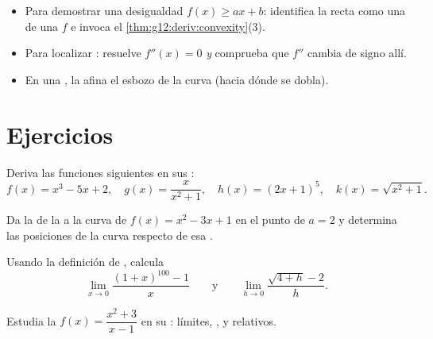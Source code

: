 \begin{method}\label{met:g12:deriv:convexity}
\begin{itemize}
  \item Para demostrar una desigualdad $f(x) \geq ax + b$: identifica la
        recta como una  de una $f$  e invoca el
        \cref{thm:g12:deriv:convexity}(3).
  \item Para localizar : resuelve $f''(x) = 0$ \emph{y}
        comprueba que $f''$ cambia de signo allí.
  \item En una , la  afina el esbozo de la
        curva (hacia dónde se dobla).
\end{itemize}
\end{method}

\section{Ejercicios}

\begin{exercise}[$\star$]\label{exo:g12:deriv:1}
Deriva las funciones siguientes en sus :
\[
f(x) = x^3 - 5x + 2, \quad
g(x) = \frac{x}{x^2+1}, \quad
h(x) = (2x+1)^5, \quad
k(x) = \sqrt{x^2 + 1}.
\]
\end{exercise}

\begin{exercise}[$\star$]\label{exo:g12:deriv:2}
Da la  de la  a la curva de $f(x) = x^2 - 3x + 1$ en el
punto de  $a = 2$ y determina las posiciones de la curva respecto de
esa .
\end{exercise}

\begin{exercise}[$\star$]\label{exo:g12:deriv:3}
Usando la definición de , calcula
\[
\lim_{x \to 0} \frac{(1+x)^{100} - 1}{x}
\qquad\text{y}\qquad
\lim_{h \to 0} \frac{\sqrt{4+h} - 2}{h}.
\]
\end{exercise}

\begin{exercise}[$\star\star$]\label{exo:g12:deriv:4}
Estudia la  $f(x) = \dfrac{x^2 + 3}{x - 1}$ en su : límites,
,  y  relativos.
\end{exercise}

